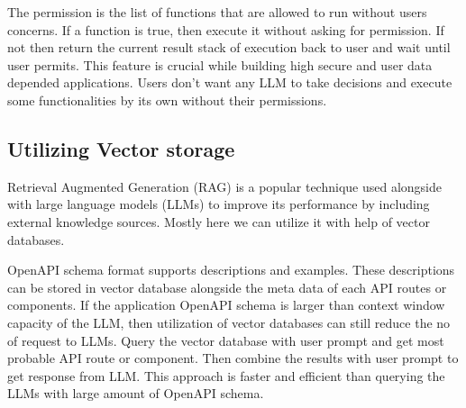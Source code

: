 \documentclass[conference]{IEEEtran}
\begin{document}
The permission is the list of functions that are allowed to run without users concerns. If a function is true, then execute it without asking for permission. If not then return the current result stack of execution back to user and wait until user permits. This feature is crucial while building high secure and user data depended applications. Users don't want any LLM to take decisions and execute some functionalities by its own without their permissions.







\subsection{Utilizing Vector storage}
Retrieval Augmented Generation (RAG) is a popular technique used alongside with large language models (LLMs) to improve its performance by including external knowledge sources. Mostly here we can utilize it with help of vector databases. 

OpenAPI schema format supports descriptions and examples. These descriptions can be stored in vector database alongside the meta data of each API routes or components. If the application OpenAPI schema is larger than context window capacity of the LLM, then utilization of vector databases can still reduce the no of request to LLMs. Query the vector database with user prompt and get most probable API route or component. Then combine the results with user prompt to get response from LLM. This approach is faster and efficient than querying the LLMs with large amount of OpenAPI schema.
\end{document}
